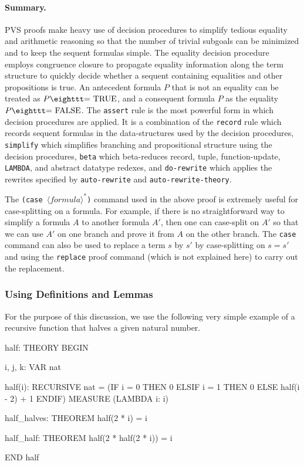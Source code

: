 \paragraph{Summary. }
PVS proofs make heavy use of decision procedures to simplify tedious
equality and arithmetic reasoning so that the number
of trivial subgoals can be minimized and to keep the sequent formulas 
simple.  The equality decision procedure employs congruence closure
to propagate equality information along the term structure to quickly
decide whether a sequent containing equalities and other propositions is
true.  An antecedent formula $P$ that is not an equality can be treated
as $P \mbox{\tt = TRUE}$, and a consequent formula $P$ as the equality
$P \mbox{\tt = FALSE}$.  The {\tt assert} rule is the most powerful form
in which decision procedures are applied.  It is a combination of
the {\tt record} rule which records sequent formulas in the
data-structures used by the decision procedures, {\tt simplify} which
simplifies branching and propositional structure using the decision
procedures, {\tt beta} which beta-reduces record, tuple,
function-update, {\tt LAMBDA}, and abstract datatype redexes,
and {\tt do-rewrite} which applies the rewrites specified by
{\tt auto-rewrite} and {\tt auto-rewrite-theory}.  

The {\tt (case $\langle formula\rangle^*$)} command used in the above
proof is extremely useful for case-splitting on a formula.  For example,
if there is no straightforward way to simplify a formula $A$ to another
formula $A'$, then one can case-split on $A'$ so that we can use $A'$ on
one branch and prove it from $A$ on the other branch.  The {\tt case}
command can also be used to replace a term $s$ by $s'$ by case-splitting
on $s = s'$ and using the {\tt replace} proof command (which is not
explained here) to carry out the replacement.

\subsubsection{Using Definitions and Lemmas}

For the purpose of this discussion, we use the following very simple
example of a recursive function that halves a given natural number.

\begin{pvsscript}\label{half}
half: THEORY
  BEGIN
  
  i, j, k: VAR nat
  
  half(i): RECURSIVE nat =
      (IF i = 0 THEN 0 ELSIF i = 1 THEN 0 ELSE half(i - 2) + 1 ENDIF)
        MEASURE (LAMBDA i: i)
  
  half_halves: THEOREM half(2 * i) = i
  
  half_half: THEOREM half(2 * half(2 * i)) = i
  
  END half
\end{pvsscript}

